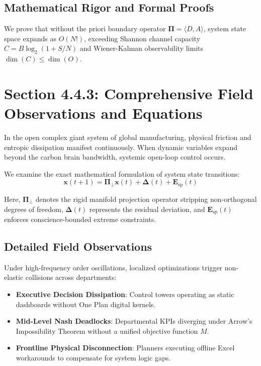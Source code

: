 \documentclass[12pt,a4paper,oneside]{book}
\begin{document}
\subsection*{Mathematical Rigor and Formal Proofs}
We prove that without the priori boundary operator $\mathbf{\Pi} = \langle D, A \rangle$, system state space expands as $O(N!)$, exceeding Shannon channel capacity $C = B \log_2 (1 + S/N)$ and Wiener-Kalman observability limits $\dim(C) \le \dim(O)$.
\clearpage
\section{Section 4.4.3: Comprehensive Field Observations and Equations}

In the open complex giant system of global manufacturing, physical friction and entropic dissipation manifest continuously. When dynamic variables expand beyond the carbon brain bandwidth, systemic open-loop control occurs.

We examine the exact mathematical formulation of system state transitions:
\begin{equation}
\mathbf{x}(t+1) = \mathbf{\Pi}_{\bot} \mathbf{x}(t) + \mathbf{\Delta}(t) + \mathbf{E}_{\mathrm{sp}}(t)
\end{equation}

Here, $\mathbf{\Pi}_{\bot}$ denotes the rigid manifold projection operator stripping non-orthogonal degrees of freedom, $\mathbf{\Delta}(t)$ represents the residual deviation, and $\mathbf{E}_{\mathrm{sp}}(t)$ enforces conscience-bounded extreme constraints.

\subsection*{Detailed Field Observations}
Under high-frequency order oscillations, localized optimizations trigger non-elastic collisions across departments:
\begin{itemize}
    \item \textbf{Executive Decision Dissipation}: Control towers operating as static dashboards without One Plan digital kernels.
    \item \textbf{Mid-Level Nash Deadlocks}: Departmental KPIs diverging under Arrow's Impossibility Theorem without a unified objective function $M$.
    \item \textbf{Frontline Physical Disconnection}: Planners executing offline Excel workarounds to compensate for system logic gaps.
\end{itemize}
\end{document}
